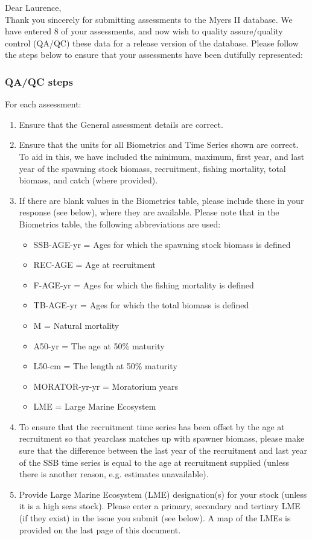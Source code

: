 \documentclass [a4paper, 10pt] {article}
\begin{document}
\noindent Dear Laurence,\\

\noindent Thank you sincerely for submitting assessments to the Myers II database. We have entered 8 of your assessments, and now wish to quality assure/quality control (QA/QC) these data for a release version of the database. Please follow the steps below to ensure that your assessments have been dutifully represented:
\subsubsection{QA/QC steps}
For each assessment:
\begin{enumerate}
\item Ensure that the General assessment details are correct.
\item Ensure that the units for all Biometrics and Time Series shown are correct. To aid in this, we have included the minimum, maximum, first year, and last year of the spawning stock biomass, recruitment, fishing mortality, total biomass, and  catch  (where provided). 
\item If there are blank values in the Biometrics table, please include these in your response (see below), where they are available.
Please note that in the Biometrics table, the following abbreviations are used:
\begin{itemize}
\item SSB-AGE-yr  = Ages for which the spawning stock biomass is defined
\item REC-AGE     = Age at recruitment
\item F-AGE-yr    = Ages for which the fishing mortality is defined 
\item TB-AGE-yr   = Ages for which the total biomass is defined
\item M      = Natural mortality
\item A50-yr      = The age at 50\% maturity
\item L50-cm      = The length at 50\% maturity
\item MORATOR-yr-yr = Moratorium years
\item LME = Large Marine Ecosystem\\
\end{itemize}
\item To ensure that the recruitment time series has been offset by the age at recruitment so that yearclass matches up with spawner biomass, please make sure that the difference between the last year of the recruitment and last year of the SSB time series is equal to the age at recruitment supplied (unless there is another reason, e.g. estimates unavailable). 
\item Provide Large Marine Ecosystem (LME) designation(s) for your stock (unless it is a high seas stock). Please enter a primary, secondary and tertiary LME (if they exist) in the issue you submit (see below). A map of the LMEs is provided on the last page of this document. 
\end{enumerate}
\vspace{-.25in}
\end{document}
